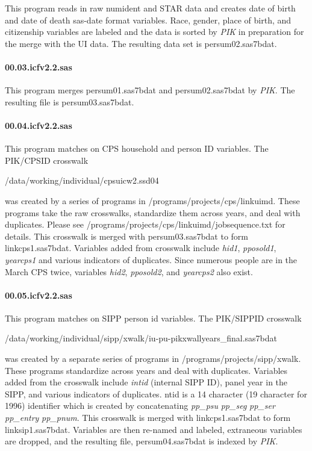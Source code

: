This program reads in raw numident and STAR data and creates date of birth
and date of death sas-date format variables. Race, gender, place of birth,
and citizenship variables are labeled and the data is sorted by \textit{PIK}
in preparation for the merge with the UI data. The resulting data set is
persum02.sas7bdat.

\paragraph{00.03.icfv2.2.sas}

This program merges persum01.sas7bdat and persum02.sas7bdat by \textit{PIK}.
The resulting file is persum03.sas7bdat.

\paragraph{00.04.icfv2.2.sas}

This program matches on CPS household and person ID variables. The PIK/CPSID
crosswalk

\begin{center}
/data/working/individual/cpsuicw2.ssd04
\end{center}

was created by a series of programs in /programs/projects/cps/linkuimd.
These programs take the raw crosswalks, standardize them across years, and
deal with duplicates. Please see
/programs/projects/cps/linkuimd/jobsequence.txt  for details. This crosswalk
is merged with persum03.sas7bdat to form linkcps1.sas7bdat. Variables added
from crosswalk include \textit{hid1}, \textit{pposold1}, \textit{yearcps1}
and various indicators of duplicates. Since numerous people are in the March
CPS twice, variables \textit{hid2}, \textit{pposold2}, and \textit{yearcps2}
also exist.

\paragraph{00.05.icfv2.2.sas}

This program matches on SIPP person id variables. The PIK/SIPPID crosswalk

\begin{center}
/data/working/individual/sipp/xwalk/iu-pu-pikxwallyears\_final.sas7bdat
\end{center}

was created by a separate series of programs in
/programs/projects/sipp/xwalk. These programs standardize across years and
deal with duplicates. Variables added from the crosswalk include \textit{%
intid} (internal SIPP ID), panel year in the SIPP, and various indicators of
duplicates. {ntid} is a 14 character (19 character for 1996) identifier
which is created by concatenating \textit{pp\_psu} \textit{pp\_seg} \textit{%
pp\_ser} \textit{pp\_entry} \textit{pp\_pnum}. This crosswalk is merged with
linkcps1.sas7bdat to form linksip1.sas7bdat. Variables are then re-named and
labeled, extraneous variables are dropped, and the resulting file,
persum04.sas7bdat is indexed by \textit{PIK}.

